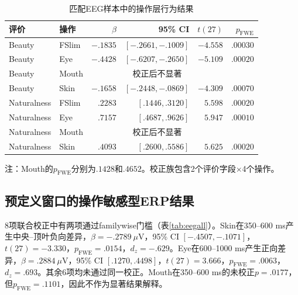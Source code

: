 \documentclass[preprint,12pt,authoryear]{elsarticle}
\newcommand{\pfwe}{p_{\mathrm{FWE}}}
\begin{document}
\begin{table}[H]
\centering
\caption{匹配EEG样本中的操作层行为结果}
\label{tab:behavior}
\begin{threeparttable}
\begin{tabular}{llrrrr}
\toprule
评价 & 操作 & $\beta$ & 95\% CI & $t(27)$ & $\pfwe$ \\
\midrule
Beauty & FSlim & $-.1835$ & $[-.2661,-.1009]$ & $-4.558$ & $.00030$ \\
Beauty & Eye   & $-.4428$ & $[-.6207,-.2650]$ & $-5.109$ & $.00020$ \\
Beauty & Mouth & \multicolumn{3}{c}{校正后不显著} \\
Beauty & Skin  & $-.1658$ & $[-.2448,-.0869]$ & $-4.309$ & $.00070$ \\
Naturalness & FSlim & $.2283$ & $[.1446,.3120]$ & $5.598$ & $.00020$ \\
Naturalness & Eye   & $.7157$ & $[.4687,.9626]$ & $5.947$ & $.00010$ \\
Naturalness & Mouth & \multicolumn{3}{c}{校正后不显著} \\
Naturalness & Skin  & $.4093$ & $[.2600,.5586]$ & $5.625$ & $.00020$ \\
\bottomrule
\end{tabular}
\begin{tablenotes}\small
\item 注：Mouth的$\pfwe$分别为$.1428$和$.4652$。校正族包含2个评价字段$\times$4个操作。
\end{tablenotes}
\end{threeparttable}
\end{table}

\subsection{预定义窗口的操作敏感型ERP结果}

8项联合校正中有两项通过familywise门槛（表\ref{tab:eegall}）。Skin在350--600 ms产生中央--顶叶负向差异，$\beta=-.2789\ \mu$V，95\% CI $[-.4507,-.1071]$，$t(27)=-3.330$，$\pfwe=.0154$，$d_z=-.629$。Eye在600--1000 ms产生正向差异，$\beta=.2884\ \mu$V，95\% CI $[.1270,.4498]$，$t(27)=3.666$，$\pfwe=.0063$，$d_z=.693$。其余6项均未通过同一校正。Mouth在350--600 ms的未校正$p=.0177$，但$\pfwe=.1101$，因此不作为显著结果解释。
\end{document}

